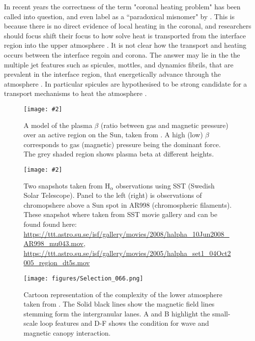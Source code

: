 \documentclass[12pt]{ociamthesis}
\newcommand{\mfig}[4]{
  \begin{figure}
  \begin{center}
  \texttt{[image: \#2]}
  \caption{#3}
  \label{#4}
  \end{center}
  \end{figure}}
\begin{document}
%
In recent years the correctness of the term "coronal heating problem" has been called into question, and even label as a ``paradoxical misnomer" by \cite{Aschwanden2007ApJ}. This is because there is no direct evidence of local heating in the coronal, and researchers should focus shift their focus to how solve heat is transported from the interface region into the upper atmosphere \citep{Aschwanden2007ApJ}. It is not clear how the transport and heating occurs between the interface regoin and corona. The answer may lie in the the multiple jet features such as spicules, mottles, and dynamics fibrils, that are prevalent in the interface region, that energetically advance through the atmosphere \citep{Tsiropoula2012}. In particular spicules are hypothesised to be strong candidate for a transport mechanisms to heat the atmosphere \citep{Kudoh1999ApJ514493K, Pontieu2007PASJ, Kudoh2008IAUS247195K, Martinez-Sykora2017,Moore2011ApJ731L18M, Pontieu2017ApJ, Samanta2019Sci, Zuo2019AcASn, Bale2019Natur}.    
\mfig{0.725}{figures/Selection_067.png}{A model of the plasma $\beta$ (ratio between gas and magnetic pressure) over an active region on the Sun, taken from \citep{Gary2001SoPh20371G}. A high (low) $\beta$ corresponds to gas (magnetic) pressure being the dominant force. The grey shaded region shows plasma beta at different heights.}{beta_profile_sun}
\mfig{1}{figures/messy_chrom.png}{Two snapshots taken from H$_\alpha$ observations using SST (Swedish Solar Telescope). Panel to the left (right) is observations of chromopshere above a Sun spot in AR998  (chromospheric filaments). These snapshot where taken from SST movie gallery and can be found found here: \url{https://ttt.astro.su.se/isf/gallery/movies/2008/halpha_10Jun2008_AR998_mu043.mov}, \url{https://ttt.astro.su.se/isf/gallery/movies/2005/halpha_set1_04Oct2005_region_dt5s.mov}}{messy_chromo}
\begin{sidewaysfigure}[ht]
    \texttt{[image: figures/Selection\_066.png]}
    \caption{Cartoon representation of the complexity of the lower atmosphere taken from \cite{Wedemeyer2009SSRv144317W}. The Solid black lines show the magnetic field lines stemming form the intergranular lanes. A and B highlight the small-scale loop features and D-F shows the condition for wave and magnetic canopy interaction.}
    \label{fig:chromo_Cart}
\end{sidewaysfigure}
\end{document}
